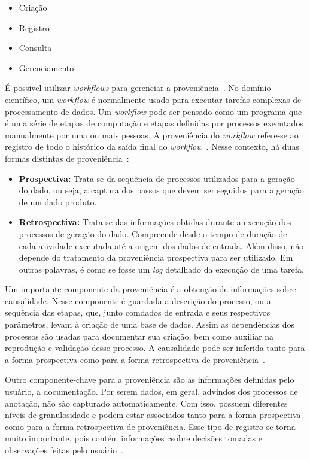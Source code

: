 \documentclass[portugues]{ic-tese}
\begin{document}
\begin{itemize}
\item Criação
\item Registro
\item Consulta
\item Gerenciamento
\end{itemize}

É possível utilizar \textit{workflows} para gerenciar a proveniência~\citep{Davidson_2008}. No domínio científico, um \textit{workflow} é normalmente usado para executar tarefas complexas de processamento de dados. Um \textit{workflow} pode ser pensado como um programa que é uma série de etapas de computação e etapas definidas por processos executados manualmente por uma ou mais pessoas. A proveniência do \textit{workflow} refere-se ao registro de todo o histórico da saída final do \textit{workflow}~\citep{Tan_2007}. Nesse contexto, há duas formas distintas de proveniência~\citep{Davidson_2008}:

\begin{itemize}
\item \textbf{Prospectiva:} Trata-se da sequência de processos utilizados para a geração do dado, ou seja, a captura dos passos que devem ser seguidos para a geração de um dado produto.
\item \textbf{Retrospectiva:} Trata-se das informações obtidas durante a execução dos processos de geração do dado. Compreende desde o tempo de duração de cada atividade executada até a origem dos dados de entrada. Além disso, não depende do tratamento da proveniência prospectiva para ser utilizado. Em outras palavras, é como se fosse um \textit{log} detalhado da execução de uma tarefa.
\end{itemize}

Um importante componente da proveniência é a obtenção de informações sobre causalidade. Nesse componente é guardada a descrição do processo, ou a sequência das etapas, que, junto comdados de entrada e seus respectivos parâmetros, levam à criação de uma base de dados. Assim as dependências dos processos são usadas para documentar sua criação, bem como auxiliar na reprodução e validação desse processo. A causalidade pode ser inferida tanto para a forma prospectiva como para a forma retrospectiva de proveniência~\citep{Davidson_2008}.

Outro componente-chave para a proveniência são as informações definidas pelo usuário, a documentação. Por serem dados, em geral, advindos dos processos de anotação, não são capturado automaticamente. Com isso, possuem diferentes níveis de granulosidade e podem estar associados tanto para a forma prospectiva como para a forma retrospectiva de proveniência. Esse tipo de registro se torna muito importante, pois contém informações csobre decisões tomadas e observações feitas pelo usuário~\citep{Davidson_2008}.
\end{document}
